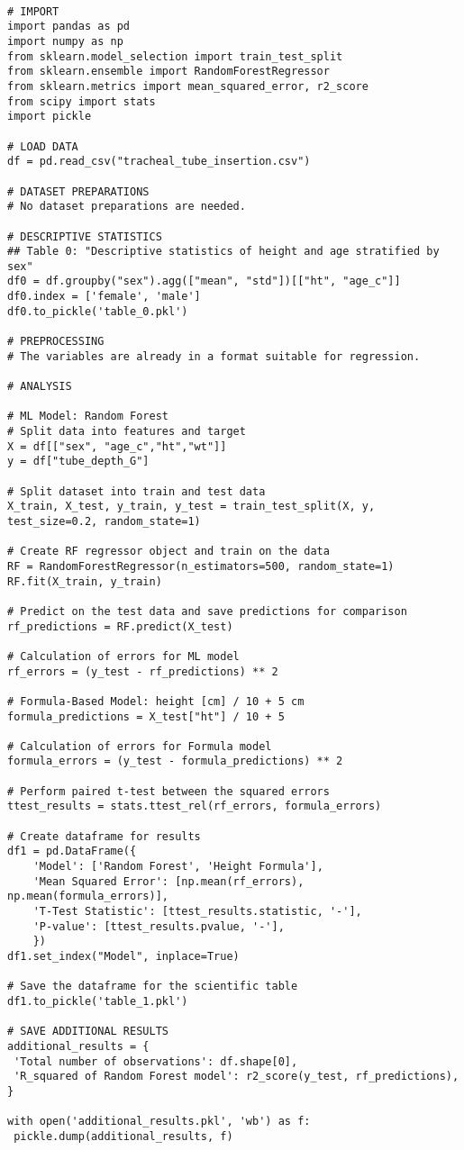 \documentclass[11pt]{article}
\begin{document}
\begin{verbatim}

# IMPORT
import pandas as pd
import numpy as np
from sklearn.model_selection import train_test_split
from sklearn.ensemble import RandomForestRegressor
from sklearn.metrics import mean_squared_error, r2_score
from scipy import stats
import pickle

# LOAD DATA
df = pd.read_csv("tracheal_tube_insertion.csv")

# DATASET PREPARATIONS
# No dataset preparations are needed.

# DESCRIPTIVE STATISTICS
## Table 0: "Descriptive statistics of height and age stratified by sex"
df0 = df.groupby("sex").agg(["mean", "std"])[["ht", "age_c"]]
df0.index = ['female', 'male']
df0.to_pickle('table_0.pkl')

# PREPROCESSING 
# The variables are already in a format suitable for regression.

# ANALYSIS

# ML Model: Random Forest
# Split data into features and target
X = df[["sex", "age_c","ht","wt"]]
y = df["tube_depth_G"]

# Split dataset into train and test data
X_train, X_test, y_train, y_test = train_test_split(X, y, test_size=0.2, random_state=1)

# Create RF regressor object and train on the data
RF = RandomForestRegressor(n_estimators=500, random_state=1)
RF.fit(X_train, y_train)

# Predict on the test data and save predictions for comparison
rf_predictions = RF.predict(X_test)

# Calculation of errors for ML model
rf_errors = (y_test - rf_predictions) ** 2

# Formula-Based Model: height [cm] / 10 + 5 cm
formula_predictions = X_test["ht"] / 10 + 5

# Calculation of errors for Formula model
formula_errors = (y_test - formula_predictions) ** 2

# Perform paired t-test between the squared errors
ttest_results = stats.ttest_rel(rf_errors, formula_errors)

# Create dataframe for results
df1 = pd.DataFrame({
    'Model': ['Random Forest', 'Height Formula'],
    'Mean Squared Error': [np.mean(rf_errors), np.mean(formula_errors)],
    'T-Test Statistic': [ttest_results.statistic, '-'],
    'P-value': [ttest_results.pvalue, '-'],
    })
df1.set_index("Model", inplace=True)

# Save the dataframe for the scientific table
df1.to_pickle('table_1.pkl')

# SAVE ADDITIONAL RESULTS
additional_results = {
 'Total number of observations': df.shape[0], 
 'R_squared of Random Forest model': r2_score(y_test, rf_predictions),
}

with open('additional_results.pkl', 'wb') as f:
 pickle.dump(additional_results, f)

\end{verbatim}
\end{document}
